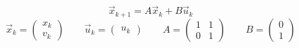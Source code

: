 \documentclass{article}
\begin{document}
\thispagestyle{empty}


$$
\vec{x}_{k+1} = A \vec{x}_k + B \vec{u}_k
$$
$$
\vec{x}_k=\begin{pmatrix}x_k\\v_k\end{pmatrix}\qquad \vec{u}_k=\begin{pmatrix}u_k\end{pmatrix}\qquad A=\begin{pmatrix} 1 & 1 \\ 0 & 1\end{pmatrix} \qquad B=\begin{pmatrix}0\\1\end{pmatrix}
$$
\end{document}
